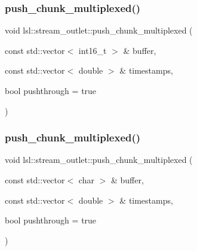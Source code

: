 \subsubsection{\texorpdfstring{push\+\_\+chunk\+\_\+multiplexed()}{push\_chunk\_multiplexed()}\hspace{0.1cm}{\footnotesize\ttfamily [12/28]}}
{\footnotesize\ttfamily void lsl\+::stream\+\_\+outlet\+::push\+\_\+chunk\+\_\+multiplexed (\begin{DoxyParamCaption}\item[{const std\+::vector$<$ int16\+\_\+t $>$ \&}]{buffer,  }\item[{const std\+::vector$<$ double $>$ \&}]{timestamps,  }\item[{bool}]{pushthrough = {\ttfamily true} }\end{DoxyParamCaption})\hspace{0.3cm}{\ttfamily [inline]}}

\mbox{\label{classlsl_1_1stream__outlet_a5ceb5a7488582559846637a310056605}} 
\subsubsection{\texorpdfstring{push\+\_\+chunk\+\_\+multiplexed()}{push\_chunk\_multiplexed()}\hspace{0.1cm}{\footnotesize\ttfamily [13/28]}}
{\footnotesize\ttfamily void lsl\+::stream\+\_\+outlet\+::push\+\_\+chunk\+\_\+multiplexed (\begin{DoxyParamCaption}\item[{const std\+::vector$<$ char $>$ \&}]{buffer,  }\item[{const std\+::vector$<$ double $>$ \&}]{timestamps,  }\item[{bool}]{pushthrough = {\ttfamily true} }\end{DoxyParamCaption})\hspace{0.3cm}{\ttfamily [inline]}}

\mbox{\label{classlsl_1_1stream__outlet_ac31c0f13ba9de7331e520b3b08ede811}} 

